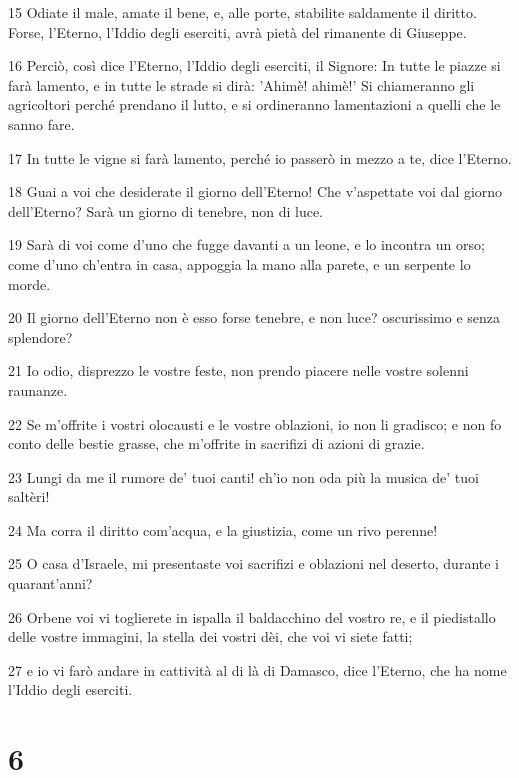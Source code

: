 \par 15 Odiate il male, amate il bene, e, alle porte, stabilite saldamente il diritto. Forse, l'Eterno, l'Iddio degli eserciti, avrà pietà del rimanente di Giuseppe.
\par 16 Perciò, così dice l'Eterno, l'Iddio degli eserciti, il Signore: In tutte le piazze si farà lamento, e in tutte le strade si dirà: 'Ahimè! ahimè!' Si chiameranno gli agricoltori perché prendano il lutto, e si ordineranno lamentazioni a quelli che le sanno fare.
\par 17 In tutte le vigne si farà lamento, perché io passerò in mezzo a te, dice l'Eterno.
\par 18 Guai a voi che desiderate il giorno dell'Eterno! Che v'aspettate voi dal giorno dell'Eterno? Sarà un giorno di tenebre, non di luce.
\par 19 Sarà di voi come d'uno che fugge davanti a un leone, e lo incontra un orso; come d'uno ch'entra in casa, appoggia la mano alla parete, e un serpente lo morde.
\par 20 Il giorno dell'Eterno non è esso forse tenebre, e non luce? oscurissimo e senza splendore?
\par 21 Io odio, disprezzo le vostre feste, non prendo piacere nelle vostre solenni raunanze.
\par 22 Se m'offrite i vostri olocausti e le vostre oblazioni, io non li gradisco; e non fo conto delle bestie grasse, che m'offrite in sacrifizi di azioni di grazie.
\par 23 Lungi da me il rumore de' tuoi canti! ch'io non oda più la musica de' tuoi saltèri!
\par 24 Ma corra il diritto com'acqua, e la giustizia, come un rivo perenne!
\par 25 O casa d'Israele, mi presentaste voi sacrifizi e oblazioni nel deserto, durante i quarant'anni?
\par 26 Orbene voi vi toglierete in ispalla il baldacchino del vostro re, e il piedistallo delle vostre immagini, la stella dei vostri dèi, che voi vi siete fatti;
\par 27 e io vi farò andare in cattività al di là di Damasco, dice l'Eterno, che ha nome l'Iddio degli eserciti.

\chapter{6}

